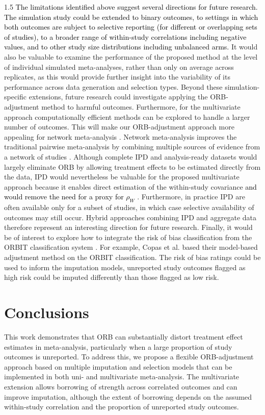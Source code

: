 \documentclass{article}
\newcommand{\mycolor}[1]{\textcolor{black}{#1}}
\begin{document}
\begin{spacing}{1.5}
\mycolor{The limitations identified above suggest several directions for future research. The simulation study could be extended to binary outcomes, to settings in which both outcomes are subject to selective reporting (for different or overlapping sets of studies), to a broader range of within-study correlations including negative values, and to other study size distributions including unbalanced arms.} It would also be valuable to examine the performance of the proposed method at the level of individual simulated meta-analyses, rather than only on average across replicates, as this would provide further insight into the variability of its performance across data generation and selection types. Beyond these simulation-specific extensions, future research could investigate applying the ORB-adjustment method to harmful outcomes. Furthermore, for the multivariate approach computationally efficient methods can be explored to handle a larger number of outcomes. This will make our ORB-adjustment approach more appealing for network meta-analysis \cite{mavridis2014selection}. Network meta-analysis improves the traditional pairwise meta-analysis by combining multiple sources of evidence from a network of studies \cite{mills2013demystifying}.
Although complete IPD and analysis-ready datasets would largely eliminate ORB by allowing treatment effects to be estimated directly from the data, IPD would nevertheless be valuable for the proposed multivariate approach because it enables direct estimation of the within-study covariance \mycolor{and would remove the need for a proxy for $\rho_W$} \cite{jackson2011multivariate, kirkham2012multivariate, mavridis2013practical, riley2015multivariate}. Furthermore, in practice IPD are often available only for a subset of studies, in which case selective availability of outcomes may still occur. Hybrid approaches combining IPD and aggregate data therefore represent an interesting direction for future research. Finally, it would be of interest to explore how to integrate the risk of bias classification from the ORBIT classification system \cite{kirkham2010impact}. For example, Copas et al. \cite{copas2014model} based their model-based adjustment method on the ORBIT classification. The risk of bias ratings could be used to inform the imputation models, \eg unreported study outcomes flagged as high risk could be imputed differently than those flagged as low risk.

\section{Conclusions}
\label{conclusion}
This work demonstrates that ORB can substantially distort treatment effect estimates in meta-analysis, particularly when a large proportion of study outcomes is unreported. To address this, we propose a flexible ORB-adjustment approach based on multiple imputation and selection models that can be implemented in both uni- and multivariate meta-analysis. The multivariate extension allows borrowing of strength across correlated outcomes and can improve imputation, although the extent of borrowing depends on the assumed within-study correlation and the proportion of unreported study outcomes.


\end{spacing}
\end{document}
